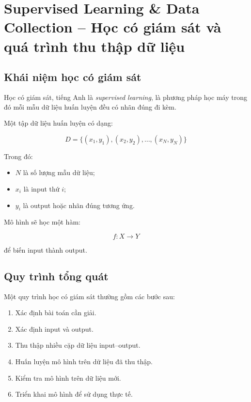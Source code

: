 \section{Supervised Learning \& Data Collection -- Học có giám sát và quá trình thu thập dữ liệu}

\subsection{Khái niệm học có giám sát}

Học có giám sát, tiếng Anh là \textit{supervised learning}, là phương pháp học máy trong đó mỗi mẫu dữ liệu huấn luyện đều có nhãn đúng đi kèm.

Một tập dữ liệu huấn luyện có dạng:

\[
    D = \{(x_1,y_1), (x_2,y_2), \ldots, (x_N,y_N)\}
\]

Trong đó:

\begin{itemize}
    \item $N$ là số lượng mẫu dữ liệu;
    \item $x_i$ là input thứ $i$;
    \item $y_i$ là output hoặc nhãn đúng tương ứng.
\end{itemize}

Mô hình sẽ học một hàm:

\[
    f: X \rightarrow Y
\]

để biến input thành output.

\subsection{Quy trình tổng quát}

Một quy trình học có giám sát thường gồm các bước sau:

\begin{enumerate}
    \item Xác định bài toán cần giải.
    \item Xác định input và output.
    \item Thu thập nhiều cặp dữ liệu input--output.
    \item Huấn luyện mô hình trên dữ liệu đã thu thập.
    \item Kiểm tra mô hình trên dữ liệu mới.
    \item Triển khai mô hình để sử dụng thực tế.
\end{enumerate}

